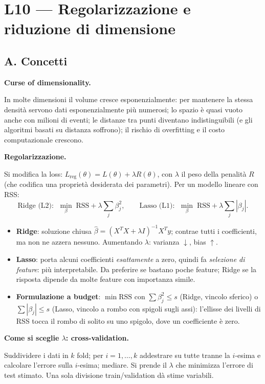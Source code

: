 \documentclass[11pt,a4paper]{article}
\newcommand{\dom}[1]{\par\smallskip\noindent\textbf{#1}\par\nopagebreak}
\begin{document}
\clearpage
\section{L10 --- Regolarizzazione e riduzione di dimensione}
\subsection*{A. Concetti}

\dom{Curse of dimensionality.} In molte dimensioni il volume cresce esponenzialmente: per mantenere la stessa densit\`a servono dati esponenzialmente pi\`u numerosi; lo spazio \`e quasi vuoto anche con milioni di eventi; le distanze tra punti diventano indistinguibili (e gli algoritmi basati su distanza soffrono); il rischio di overfitting e il costo computazionale crescono.

\dom{Regolarizzazione.} Si modifica la loss: $L_{\mathrm{reg}}(\theta)=L(\theta)+\lambda R(\theta)$, con $\lambda$ il peso della penalit\`a $R$ (che codifica una propriet\`a desiderata dei parametri). Per un modello lineare con RSS:
\[
\text{Ridge (L2): }\;\min_\beta\;\mathrm{RSS}+\lambda\sum_j\beta_j^2,\qquad
\text{Lasso (L1): }\;\min_\beta\;\mathrm{RSS}+\lambda\sum_j|\beta_j|.
\]
\begin{itemize}
\item \textbf{Ridge}: soluzione chiusa $\hat\beta=(X^TX+\lambda I)^{-1}X^Ty$; contrae tutti i coefficienti, ma non ne azzera nessuno. Aumentando $\lambda$: varianza $\downarrow$, bias $\uparrow$.
\item \textbf{Lasso}: porta alcuni coefficienti \emph{esattamente} a zero, quindi fa \emph{selezione di feature}: pi\`u interpretabile. Da preferire se bastano poche feature; Ridge se la risposta dipende da molte feature con importanza simile.
\item \textbf{Formulazione a budget}: $\min \mathrm{RSS}$ con $\sum\beta_j^2\le s$ (Ridge, vincolo sferico) o $\sum|\beta_j|\le s$ (Lasso, vincolo a rombo con spigoli sugli assi): l'ellisse dei livelli di RSS tocca il rombo di solito su uno spigolo, dove un coefficiente \`e zero.
\end{itemize}

\dom{Come si sceglie $\lambda$: cross-validation.} Suddividere i dati in $k$ fold; per $i=1,\dots,k$ addestrare su tutte tranne la $i$-esima e calcolare l'errore sulla $i$-esima; mediare. Si prende il $\lambda$ che minimizza l'errore di test stimato. Una sola divisione train/validation d\`a stime variabili.
\end{document}
